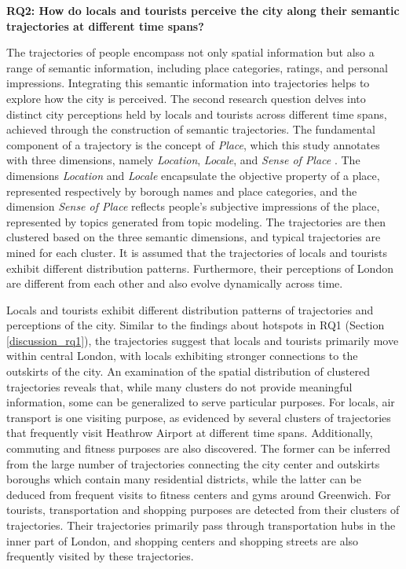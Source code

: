 \documentclass{article}
\theoremstyle{remark}
\begin{document}
\textbf{RQ2: How do locals and tourists perceive the city along their semantic trajectories at different time spans?}

The trajectories of people encompass not only spatial information but also a range of semantic information, including place categories, ratings, and personal impressions. Integrating this semantic information into trajectories helps to explore how the city is perceived. The second research question delves into distinct city perceptions held by locals and tourists across different time spans, achieved through the construction of semantic trajectories. The fundamental component of a trajectory is the concept of \textit{Place}, which this study annotates with three dimensions, namely \textit{Location}, \textit{Locale}, and \textit{Sense of Place} \citep{agnew_space_2011}. The dimensions \textit{Location} and \textit{Locale} encapsulate the objective property of a place, represented respectively by borough names and place categories, and the dimension \textit{Sense of Place} reflects people's subjective impressions of the place, represented by topics generated from topic modeling. The trajectories are then clustered based on the three semantic dimensions, and typical trajectories are mined for each cluster. It is assumed that the trajectories of locals and tourists exhibit different distribution patterns. Furthermore, their perceptions of London are different from each other and also evolve dynamically across time.

Locals and tourists exhibit different distribution patterns of trajectories and perceptions of the city. Similar to the findings about hotspots in RQ1 (Section \ref{discussion_rq1}), the trajectories suggest that locals and tourists primarily move within central London, with locals exhibiting stronger connections to the outskirts of the city. An examination of the spatial distribution of clustered trajectories reveals that, while many clusters do not provide meaningful information, some can be generalized to serve particular purposes. For locals, air transport is one visiting purpose, as evidenced by several clusters of trajectories that frequently visit Heathrow Airport at different time spans. Additionally, commuting and fitness purposes are also discovered. The former can be inferred from the large number of trajectories connecting the city center and outskirts boroughs which contain many residential districts, while the latter can be deduced from frequent visits to fitness centers and gyms around Greenwich. For tourists, transportation and shopping purposes are detected from their clusters of trajectories. Their trajectories primarily pass through transportation hubs in the inner part of London, and shopping centers and shopping streets are also frequently visited by these trajectories.
\end{document}

